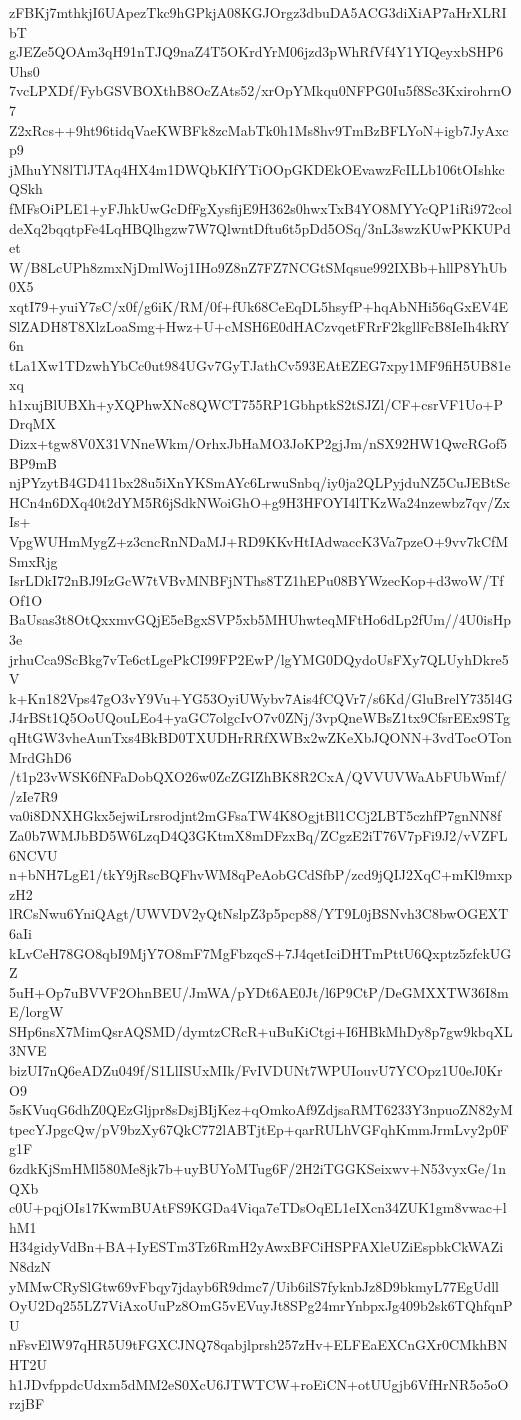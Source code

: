 zFBKj7mthkjI6UApezTkc9hGPkjA08KGJOrgz3dbuDA5ACG3diXiAP7aHrXLRIbT
gJEZe5QOAm3qH91nTJQ9naZ4T5OKrdYrM06jzd3pWhRfVf4Y1YIQeyxbSHP6Uhs0
7vcLPXDf/FybGSVBOXthB8OcZAts52/xrOpYMkqu0NFPG0Iu5f8Sc3KxirohrnO7
Z2xRcs++9ht96tidqVaeKWBFk8zcMabTk0h1Ms8hv9TmBzBFLYoN+igb7JyAxcp9
jMhuYN8lTlJTAq4HX4m1DWQbKIfYTiOOpGKDEkOEvawzFcILLb106tOIshkcQSkh
fMFsOiPLE1+yFJhkUwGcDfFgXysfijE9H362s0hwxTxB4YO8MYYcQP1iRi972col
deXq2bqqtpFe4LqHBQlhgzw7W7QlwntDftu6t5pDd5OSq/3nL3swzKUwPKKUPdet
W/B8LcUPh8zmxNjDmlWoj1IHo9Z8nZ7FZ7NCGtSMqsue992IXBb+hllP8YhUb0X5
xqtI79+yuiY7sC/x0f/g6iK/RM/0f+fUk68CeEqDL5hsyfP+hqAbNHi56qGxEV4E
SlZADH8T8XlzLoaSmg+Hwz+U+cMSH6E0dHACzvqetFRrF2kgllFcB8IeIh4kRY6n
tLa1Xw1TDzwhYbCc0ut984UGv7GyTJathCv593EAtEZEG7xpy1MF9fiH5UB81exq
h1xujBlUBXh+yXQPhwXNc8QWCT755RP1GbhptkS2tSJZl/CF+csrVF1Uo+PDrqMX
Dizx+tgw8V0X31VNneWkm/OrhxJbHaMO3JoKP2gjJm/nSX92HW1QwcRGof5BP9mB
njPYzytB4GD411bx28u5iXnYKSmAYc6LrwuSnbq/iy0ja2QLPyjduNZ5CuJEBtSc
HCn4n6DXq40t2dYM5R6jSdkNWoiGhO+g9H3HFOYI4lTKzWa24nzewbz7qv/ZxIs+
VpgWUHmMygZ+z3cncRnNDaMJ+RD9KKvHtIAdwaccK3Va7pzeO+9vv7kCfMSmxRjg
IsrLDkI72nBJ9IzGcW7tVBvMNBFjNThs8TZ1hEPu08BYWzecKop+d3woW/TfOf1O
BaUsas3t8OtQxxmvGQjE5eBgxSVP5xb5MHUhwteqMFtHo6dLp2fUm//4U0isHp3e
jrhuCca9ScBkg7vTe6ctLgePkCI99FP2EwP/lgYMG0DQydoUsFXy7QLUyhDkre5V
k+Kn182Vps47gO3vY9Vu+YG53OyiUWybv7Ais4fCQVr7/s6Kd/GluBrelY735l4G
J4rBSt1Q5OoUQouLEo4+yaGC7olgcIvO7v0ZNj/3vpQneWBsZ1tx9CfsrEEx9STg
qHtGW3vheAunTxs4BkBD0TXUDHrRRfXWBx2wZKeXbJQONN+3vdTocOTonMrdGhD6
/t1p23vWSK6fNFaDobQXO26w0ZcZGIZhBK8R2CxA/QVVUVWaAbFUbWmf//zIe7R9
va0i8DNXHGkx5ejwiLrsrodjnt2mGFsaTW4K8OgjtBl1CCj2LBT5czhfP7gnNN8f
Za0b7WMJbBD5W6LzqD4Q3GKtmX8mDFzxBq/ZCgzE2iT76V7pFi9J2/vVZFL6NCVU
n+bNH7LgE1/tkY9jRscBQFhvWM8qPeAobGCdSfbP/zcd9jQIJ2XqC+mKl9mxpzH2
lRCsNwu6YniQAgt/UWVDV2yQtNslpZ3p5pcp88/YT9L0jBSNvh3C8bwOGEXT6aIi
kLvCeH78GO8qbI9MjY7O8mF7MgFbzqcS+7J4qetIciDHTmPttU6Qxptz5zfckUGZ
5uH+Op7uBVVF2OhnBEU/JmWA/pYDt6AE0Jt/l6P9CtP/DeGMXXTW36I8mE/lorgW
SHp6nsX7MimQsrAQSMD/dymtzCRcR+uBuKiCtgi+I6HBkMhDy8p7gw9kbqXL3NVE
bizUI7nQ6eADZu049f/S1LlISUxMIk/FvIVDUNt7WPUIouvU7YCOpz1U0eJ0KrO9
5sKVuqG6dhZ0QEzGljpr8sDsjBIjKez+qOmkoAf9ZdjsaRMT6233Y3npuoZN82yM
tpecYJpgcQw/pV9bzXy67QkC772lABTjtEp+qarRULhVGFqhKmmJrmLvy2p0Fg1F
6zdkKjSmHMl580Me8jk7b+uyBUYoMTug6F/2H2iTGGKSeixwv+N53vyxGe/1nQXb
c0U+pqjOIs17KwmBUAtFS9KGDa4Viqa7eTDsOqEL1eIXcn34ZUK1gm8vwac+lhM1
H34gidyVdBn+BA+IyESTm3Tz6RmH2yAwxBFCiHSPFAXleUZiEspbkCkWAZiN8dzN
yMMwCRySlGtw69vFbqy7jdayb6R9dmc7/Uib6ilS7fyknbJz8D9bkmyL77EgUdll
OyU2Dq255LZ7ViAxoUuPz8OmG5vEVuyJt8SPg24mrYnbpxJg409b2sk6TQhfqnPU
nFsvElW97qHR5U9tFGXCJNQ78qabjlprsh257zHv+ELFEaEXCnGXr0CMkhBNHT2U
h1JDvfppdcUdxm5dMM2eS0XcU6JTWTCW+roEiCN+otUUgjb6VfHrNR5o5oOrzjBF
